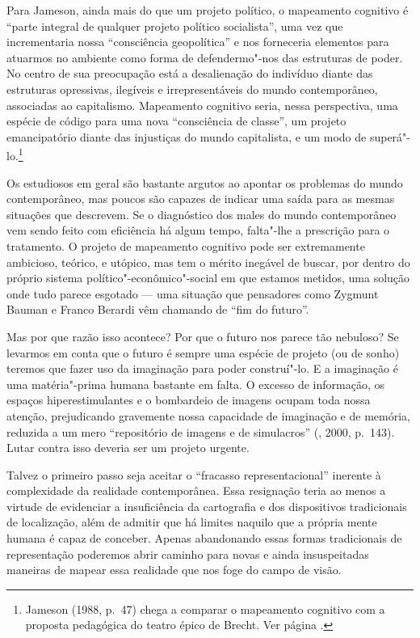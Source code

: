 Para Jameson, ainda mais do que um projeto político, o mapeamento
cognitivo é ``parte integral de qualquer projeto político socialista'',
uma vez que incrementaria nossa ``consciência geopolítica'' e nos
forneceria elementos para atuarmos no ambiente como forma de
defendermo"-nos das estruturas de poder. No centro de sua preocupação
está a desalienação do indivíduo diante das estruturas opressivas,
ilegíveis e irrepresentáveis do mundo contemporâneo, associadas ao
capitalismo. Mapeamento cognitivo seria, nessa perspectiva, uma espécie
de código para uma nova ``consciência de classe'', um projeto
emancipatório diante das injustiças do mundo capitalista, e um modo de
superá"-lo.\footnote{Jameson (1988, p.~47) chega a comparar o mapeamento cognitivo com a proposta pedagógica do teatro épico de Brecht. Ver página \pageref{verfremdungseffekt}.}

Os estudiosos em geral são bastante argutos ao apontar os problemas do
mundo contemporâneo, mas poucos são capazes de indicar uma saída para as
mesmas situações que descrevem. Se o diagnóstico dos males do mundo
contemporâneo vem sendo feito com eficiência há algum tempo, falta"-lhe a
prescrição para o tratamento. O projeto de mapeamento cognitivo pode ser
extremamente ambicioso, teórico, e utópico, mas tem o mérito inegável de
buscar, por dentro do próprio sistema político"-econômico"-social em que estamos metidos, uma solução onde tudo parece esgotado --- uma situação que
pensadores como Zygmunt Bauman e Franco Berardi vêm chamando de ``fim do
futuro''.

Mas por que razão isso acontece? Por que o futuro nos parece tão
nebuloso? Se levarmos em conta que o futuro é sempre uma espécie de
projeto (ou de sonho) teremos que fazer uso da imaginação para poder
construí"-lo. E a imaginação é uma matéria"-prima humana bastante em
falta. O excesso de informação, os espaços hiperestimulantes e o
bombardeio de imagens ocupam toda nossa atenção, prejudicando gravemente
nossa capacidade de imaginação e de memória, reduzida a um mero ``repositório de imagens e de simulacros'' (, 2000, p.~143). Lutar contra isso deveria ser um projeto
urgente.

Talvez o primeiro passo seja aceitar o ``fracasso representacional''
inerente à complexidade da realidade contemporânea. Essa resignação
teria ao menos a virtude de evidenciar a insuficiência da cartografia e
dos dispositivos tradicionais de localização, além de admitir que há limites naquilo que a própria mente humana é capaz de conceber. Apenas abandonando essas formas tradicionais de
representação poderemos abrir caminho para novas e ainda insuspeitadas
maneiras de mapear essa realidade que nos foge do campo de visão.

